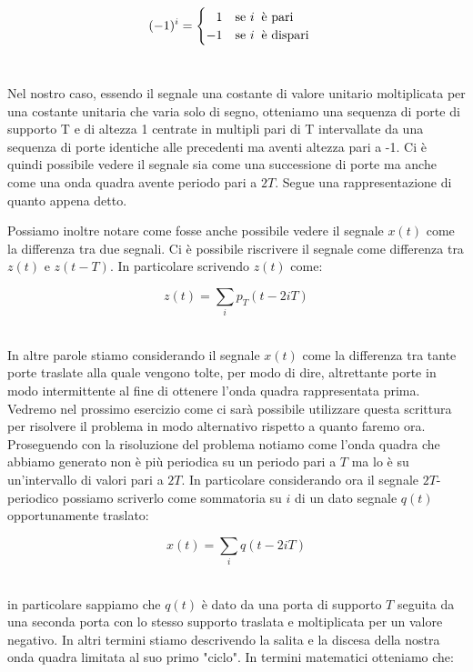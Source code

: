 \documentclass[../main.tex]{subfiles}
\begin{document}
\[ (-1)^i = \begin{cases}

\;\:\; 1 \hspace{10pt} $se $ i\;\;$è pari$\\
-1 \hspace{10pt} $se $ i\;\;$è dispari$\\
	
\end{cases} \]\


Nel nostro caso, essendo il segnale una costante di valore unitario moltiplicata per una costante unitaria che varia solo di segno, otteniamo una sequenza di porte di supporto T e di altezza 1 centrate in multipli pari di T intervallate da una sequenza di porte identiche alle precedenti ma aventi altezza pari a -1.
Ci è quindi possibile vedere il segnale sia come una successione di porte ma anche come una onda quadra avente periodo pari a $2T$.
Segue una rappresentazione di quanto appena detto.


Possiamo inoltre notare come fosse anche possibile vedere il segnale $x(t)$ come la differenza tra due segnali. Ci è possibile riscrivere il segnale come differenza tra $z(t)$ e $z(t - T)$. In particolare scrivendo $z(t)$ come:

\[z(t) = \sum_i p_T(t - 2iT) \]\

In altre parole stiamo considerando il segnale $x(t)$ come la differenza tra tante porte traslate alla quale vengono tolte, per modo di dire, altrettante porte in modo intermittente al fine di ottenere l'onda quadra rappresentata prima.
Vedremo nel prossimo esercizio come ci sarà possibile utilizzare questa scrittura per risolvere il problema in modo alternativo rispetto a quanto faremo ora.\\

Proseguendo con la risoluzione del problema notiamo come l'onda quadra che abbiamo generato non è più periodica su un periodo pari a $T$ ma lo è su un'intervallo di valori pari a $2T$.
In particolare considerando ora il segnale $2T$-periodico possiamo scriverlo come sommatoria su $i$ di un dato segnale $q(t)$ opportunamente traslato:

\[x(t) = \sum_i q(t - 2iT) \]\

in particolare sappiamo che $q(t)$ è dato da una porta di supporto $T$ seguita da una seconda porta con lo stesso supporto traslata e moltiplicata per un valore negativo. In altri termini stiamo descrivendo la salita e la discesa della nostra onda quadra limitata al suo primo "ciclo". In termini matematici otteniamo che:
\end{document}
